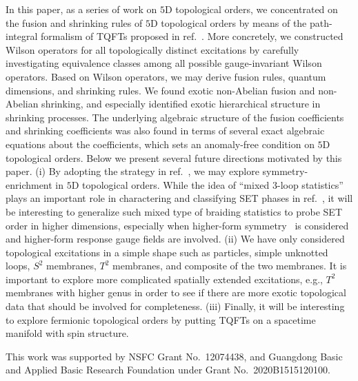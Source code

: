 \documentclass[11pt,nofootinbib,preprint]{revtex4-1}
\begin{document}
In this paper, as a series of work on $5$D topological orders, we   concentrated on the fusion and shrinking rules of $5$D topological orders by means of the path-integral formalism of TQFTs proposed in ref.~\cite{Zhang:2021ycl}. More concretely, we constructed Wilson operators for all topologically distinct excitations by carefully investigating equivalence classes among all possible gauge-invariant Wilson operators.  
Based on Wilson operators, we may derive fusion rules, quantum dimensions, and shrinking rules. We found exotic non-Abelian fusion and non-Abelian shrinking, and especially identified exotic hierarchical structure in shrinking processes.  The underlying algebraic structure of the fusion coefficients and shrinking coefficients was also found in terms of several exact algebraic equations about the coefficients, which sets an anomaly-free condition on $5$D topological orders.  Below we present several future directions motivated by this paper.  (i) By adopting the strategy in ref.~\cite{Ning2018prb}, we may explore symmetry-enrichment in $5$D topological orders. While the idea of ``mixed $3$-loop statistics'' plays an important role in charactering and classifying SET phases in ref.~\cite{Ning2018prb}, it will be interesting to generalize such mixed type of braiding statistics to probe SET order in higher dimensions, especially when higher-form symmetry~\cite{mcgreevy2023} is considered and higher-form response gauge fields are involved.
(ii) We have only considered topological excitations in a simple shape such as particles, simple unknotted loops, $S^2$ membranes,   $T^2$ membranes, and composite of the two membranes. It is important to explore more complicated spatially extended excitations, e.g., $T^2$ membranes with higher genus in order to see if there are more exotic topological data that should be involved for completeness. 
(iii) Finally, it will be interesting to explore fermionic topological orders by putting TQFTs on a spacetime manifold with spin structure.
  

\acknowledgements
This work was supported by NSFC Grant  No.~12074438, and Guangdong Basic and Applied Basic Research Foundation under Grant No.~2020B1515120100.

\appendix
\end{document}
